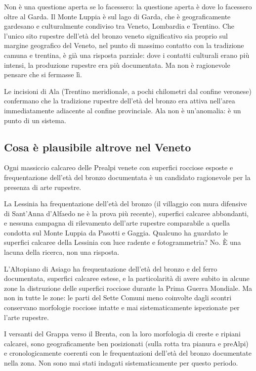 Non è una questione aperta se lo facessero: la questione aperta è dove lo facessero oltre al Garda. Il Monte Luppia è sul lago di Garda, che è geograficamente gardesano e culturalmente condiviso tra Veneto, Lombardia e Trentino. Che l'unico sito rupestre dell'età del bronzo veneto significativo sia proprio sul margine geografico del Veneto, nel punto di massimo contatto con la tradizione camuna e trentina, è già una risposta parziale: dove i contatti culturali erano più intensi, la produzione rupestre era più documentata. Ma non è ragionevole pensare che si fermasse lì.

Le incisioni di Ala (Trentino meridionale, a pochi chilometri dal confine veronese) confermano che la tradizione rupestre dell'età del bronzo era attiva nell'area immediatamente adiacente al confine provinciale. Ala non è un'anomalia: è un punto di un sistema.

\subsection{Cosa è plausibile altrove nel Veneto}

Ogni massiccio calcareo delle Prealpi venete con superfici rocciose esposte e frequentazione dell'età del bronzo documentata è un candidato ragionevole per la presenza di arte rupestre.

La Lessinia ha frequentazione dell'età del bronzo (il villaggio con mura difensive di Sant'Anna d'Alfaedo ne è la prova più recente), superfici calcaree abbondanti, e nessuna campagna di rilevamento dell'arte rupestre comparabile a quella condotta sul Monte Luppia da Pasotti e Gaggia. Qualcuno ha guardato le superfici calcaree della Lessinia con luce radente e fotogrammetria? No. È una lacuna della ricerca, non una risposta.

L'Altopiano di Asiago ha frequentazione dell'età del bronzo e del ferro documentata, superfici calcaree estese, e la particolarità di avere subito in alcune zone la distruzione delle superfici rocciose durante la Prima Guerra Mondiale. Ma non in tutte le zone: le parti del Sette Comuni meno coinvolte dagli scontri conservano morfologie rocciose intatte e mai sistematicamente ispezionate per l'arte rupestre.

I versanti del Grappa verso il Brenta, con la loro morfologia di creste e ripiani calcarei, sono geograficamente ben posizionati (sulla rotta tra pianura e preAlpi) e cronologicamente coerenti con le frequentazioni dell'età del bronzo documentate nella zona. Non sono mai stati indagati sistematicamente per questo periodo.

